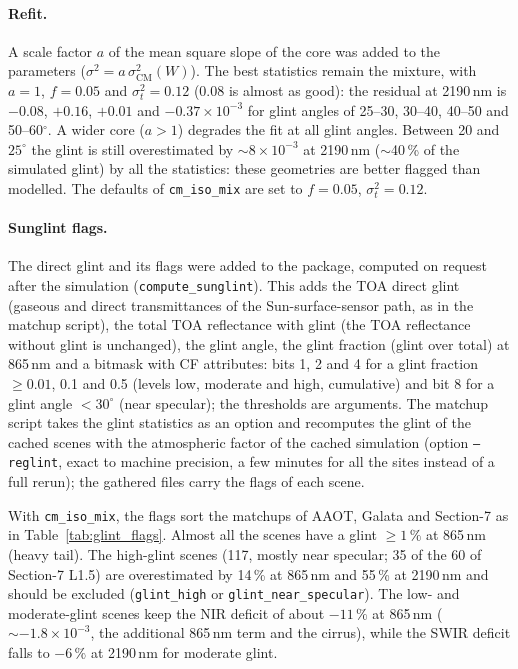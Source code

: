 \documentclass[11pt,a4paper]{article}
\newcommand{\code}[1]{\texttt{#1}}
\begin{document}
\paragraph{Refit.} A scale factor $a$ of the mean square slope of the core was added to the parameters
($\sigma^2 = a\,\sigma^2_\mathrm{CM}(W)$). The best statistics remain the mixture, with $a=1$, $f = 0.05$ and
$\sigma_t^2 = 0.12$ (0.08 is almost as good): the residual at 2190\,nm is $-0.08$, $+0.16$, $+0.01$ and
$-0.37\times10^{-3}$ for glint angles of 25--30, 30--40, 40--50 and 50--60$^\circ$. A wider core ($a>1$) degrades
the fit at all glint angles. Between 20 and $25^\circ$ the glint is still overestimated by $\sim8\times10^{-3}$ at
2190\,nm ($\sim$40\,\% of the simulated glint) by all the statistics: these geometries are better flagged than
modelled. The defaults of \code{cm\_iso\_mix} are set to $f=0.05$, $\sigma_t^2=0.12$.

\paragraph{Sunglint flags.} The direct glint and its flags were added to the package, computed on request
after the simulation (\code{compute\_sunglint}). This adds the TOA direct
glint (gaseous and direct transmittances of the Sun-surface-sensor path, as in the matchup script), the total TOA
reflectance with glint (the TOA reflectance without glint is unchanged), the glint angle, the glint fraction (glint
over total) at 865\,nm and a bitmask with CF attributes: bits 1, 2 and 4 for a glint fraction $\geq0.01$, 0.1 and
0.5 (levels low, moderate and high, cumulative) and bit 8 for a glint angle $<30^\circ$ (near specular); the
thresholds are arguments. The matchup script takes the glint statistics as an option and recomputes the glint of the
cached scenes with the atmospheric factor of the cached simulation (option \code{--reglint}, exact to machine
precision, a few minutes for all the sites instead of a full rerun); the gathered files carry the flags of each
scene.

With \code{cm\_iso\_mix}, the flags sort the matchups of AAOT, Galata and Section-7 as in
Table~\ref{tab:glint_flags}. Almost all the scenes have a glint $\geq1\,\%$ at 865\,nm (heavy tail). The high-glint
scenes (117, mostly near specular; 35 of the 60 of Section-7 L1.5) are overestimated by 14\,\% at 865\,nm and
55\,\% at 2190\,nm and should be excluded (\code{glint\_high} or \code{glint\_near\_specular}). The low- and
moderate-glint scenes keep the NIR deficit of about $-11\,\%$ at 865\,nm ($\sim-1.8\times10^{-3}$, the additional
865\,nm term and the cirrus), while the SWIR deficit falls to $-6\,\%$ at 2190\,nm for moderate glint.
\end{document}
